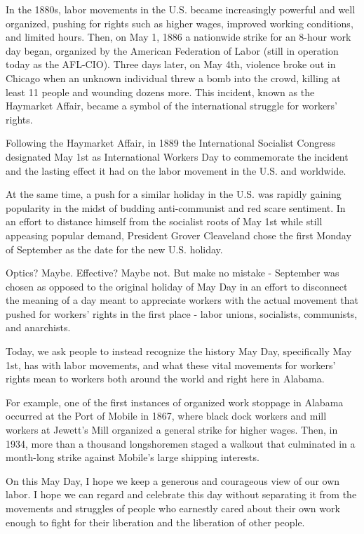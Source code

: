 \documentclass[
]{book}
\begin{document}
In the 1880s, labor movements in the U.S. became increasingly powerful and well organized, pushing for rights such as higher wages, improved working conditions, and limited hours. Then, on May 1, 1886 a nationwide strike for an 8-hour work day began, organized by the American Federation of Labor (still in operation today as the AFL-CIO). Three days later, on May 4th, violence broke out in Chicago when an unknown individual threw a bomb into the crowd, killing at least 11 people and wounding dozens more. This incident, known as the Haymarket Affair, became a symbol of the international struggle for workers' rights.

Following the Haymarket Affair, in 1889 the International Socialist Congress designated May 1st as International Workers Day to commemorate the incident and the lasting effect it had on the labor movement in the U.S. and worldwide.

At the same time, a push for a similar holiday in the U.S. was rapidly gaining popularity in the midst of budding anti-communist and red scare sentiment. In an effort to distance himself from the socialist roots of May 1st while still appeasing popular demand, President Grover Cleaveland chose the first Monday of September as the date for the new U.S. holiday.

Optics? Maybe. Effective? Maybe not. But make no mistake - September was chosen as opposed to the original holiday of May Day in an effort to disconnect the meaning of a day meant to appreciate workers with the actual movement that pushed for workers' rights in the first place - labor unions, socialists, communists, and anarchists.

Today, we ask people to instead recognize the history May Day, specifically May 1st, has with labor movements, and what these vital movements for workers' rights mean to workers both around the world and right here in Alabama.

For example, one of the first instances of organized work stoppage in Alabama occurred at the Port of Mobile in 1867, where black dock workers and mill workers at Jewett's Mill organized a general strike for higher wages. Then, in 1934, more than a thousand longshoremen staged a walkout that culminated in a month-long strike against Mobile's large shipping interests.

On this May Day, I hope we keep a generous and courageous view of our own labor. I hope we can regard and celebrate this day without separating it from the movements and struggles of people who earnestly cared about their own work enough to fight for their liberation and the liberation of other people.
\end{document}

